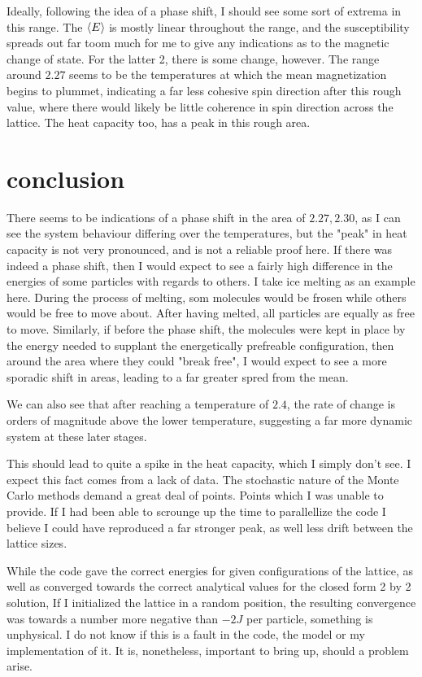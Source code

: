 \documentclass[10pt, twocolumn]{revtex4-1}
\begin{document}
Ideally, following the idea of a phase shift, I should see some sort of extrema in this range. The $\ev{E}$ is mostly linear throughout the range,
and the susceptibility spreads out far toom much for me to give any indications as to the magnetic change of state. For the latter 2, there is some change,
however. The range around $2.27$ seems to be the temperatures at which the mean magnetization begins to plummet, indicating a far less cohesive spin direction
after this rough value, where there would likely be little coherence in spin direction across the lattice. The heat capacity too, has a peak in this rough
area.



\section{conclusion}

There seems to be indications of a phase shift in the area of $2.27, 2.30$, as I can see the system behaviour differing over the temperatures, but the "peak"
in heat capacity is not very pronounced, and is not a reliable proof here. If there was indeed a phase shift, then I would expect to see a fairly high
difference in the energies of some particles with regards to others. I take ice melting as an example here. During the process of melting, som molecules
would be frosen while others would be free to move about. After having melted, all particles are equally as free to move. Similarly, if before the phase
shift, the molecules were kept in place by the energy needed to supplant the energetically prefreable configuration, then around the area where they could
"break free", I would expect to see a more sporadic shift in areas, leading to a far greater spred from the mean.

We can also see that after reaching a temperature of $2.4$, the rate of change is orders of magnitude above the lower temperature, suggesting a far more
dynamic system at these later stages.

This should lead to quite a spike in the heat capacity, which I
simply don't see. I expect this fact comes from a lack of data. The stochastic nature of the Monte Carlo methods demand a great deal of points. Points which I
was unable to provide. If I had been able to scrounge up the time to parallellize the code I believe I could have reproduced a far stronger peak, as well less
drift between the lattice sizes.

While the code gave the correct energies for given configurations of the lattice, as well as converged towards the correct analytical values for the closed
form 2 by 2 solution, If I initialized the lattice in a random position, the resulting convergence was towards a number more negative than $-2J$ per particle,
something is unphysical. I do not know if this is a fault in the code, the model or my implementation of it. It is, nonetheless, important to bring up, should
a problem arise.
\end{document}

